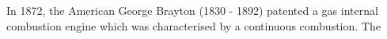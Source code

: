 In 1872, the American George Brayton (1830 - 1892) patented a gas internal combustion engine which was characterised by a continuous combustion\cite{Boles2006}. The  






